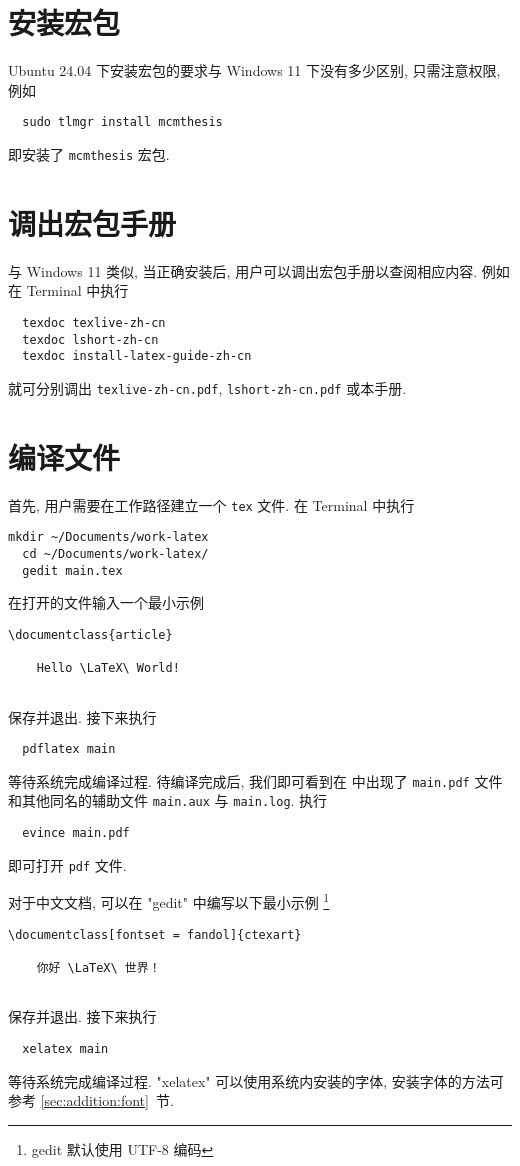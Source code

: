 \section{安装宏包}\label{sec:ubuntu:installpackage}

Ubuntu 24.04 下安装宏包的要求与 Windows 11 下没有多少区别, 只需注意权限, 例如
\begin{lstlisting}
  sudo tlmgr install mcmthesis
\end{lstlisting}
即安装了 \texttt{mcmthesis} 宏包.

\section{调出宏包手册}\label{sec:ubuntu:texdoc}

与 Windows 11 类似,
当正确安装后,
用户可以调出宏包手册以查阅相应内容.
例如在 \textsf{Terminal} 中执行
\begin{lstlisting}
  texdoc texlive-zh-cn
  texdoc lshort-zh-cn
  texdoc install-latex-guide-zh-cn
\end{lstlisting}
就可分别调出 \texttt{texlive-zh-cn.pdf},
\texttt{lshort-zh-cn.pdf}
或本手册.

\section{编译文件}

首先, 用户需要在工作路径建立一个 \texttt{tex} 文件.
在 \textsf{Terminal} 中执行
\begin{lstlisting}[deletekeywords = tex]
  mkdir ~/Documents/work-latex
  cd ~/Documents/work-latex/
  gedit main.tex
\end{lstlisting}
在打开的文件输入一个最小示例
\begin{lstlisting}[language = mwe]
  \documentclass{article}
  
    Hello \LaTeX\ World!
  
\end{lstlisting}
保存并退出. 
接下来执行
\begin{lstlisting}
  pdflatex main
\end{lstlisting}
等待系统完成编译过程. 
待编译完成后,
我们即可看到在  中出现了
\texttt{main.pdf} 文件和其他同名的辅助文件 \texttt{main.aux} 与
\texttt{main.log}. 
执行
\begin{lstlisting}
  evince main.pdf
\end{lstlisting}
即可打开 \texttt{pdf} 文件.

对于中文文档, 可以在 "gedit" 中编写以下最小示例%
\footnote{gedit 默认使用 UTF-8 编码}%
\begin{lstlisting}[language = mwe]
  \documentclass[fontset = fandol]{ctexart}
  
    你好 \LaTeX\ 世界！
  
\end{lstlisting}
保存并退出.
接下来执行
\begin{lstlisting}
  xelatex main
\end{lstlisting}
等待系统完成编译过程.
"xelatex" 可以使用系统内安装的字体,
安装字体的方法可参考 \ref{sec:addition:font}~节.

